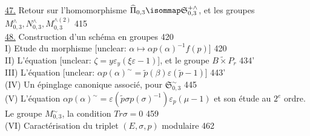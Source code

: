 \vspace{0.5em}
\noindent \underline{47.} Retour sur l'homomorphisme $\widehat{\Pi}_{0,3} \isommap \mathfrak{S}^{+\wedge}_{0,3}$, et les groupes $M_{0,3}^\wedge, N_{0,3}^\wedge, M_{0,3}^{\wedge(2)}$ \hfill 415\\
\underline{48.} Construction d'un schéma en groupes \hfill 420\\
\hspace*{1em} I) Etude du morphisme [unclear: $\alpha \mapsto \alpha p(\alpha)^{-1} f(p)$] \hfill 420\\
\hspace*{1em} II) L'équation [unclear: $\zeta = y \varepsilon_y (\xi \varepsilon - 1)$], et le groupe $B \tilde{\times} P_r$ \hfill 434'\\
\hspace*{1em} III) L'équation [unclear: $\alpha p(\alpha)^\sim = \tilde{p}(\beta)\varepsilon(\tilde{p}-1)$] \hfill 443'\\
\hspace*{1em} (IV) Un épinglage canonique associé, pour $\mathfrak{S}_{0,3}^\sim$ \hfill 445\\
\hspace*{1em} (V) L'équation $\alpha p(\alpha)^\sim = \varepsilon(\tilde{p} \sigma p(\sigma)^{-1}) \varepsilon_p(\mu - 1)$ et son étude au $2^e$ ordre. Le groupe $M_{0,3}^\sim$, la condition $Tr \sigma = 0$ \hfill 459\\
\hspace*{1em} (VI) Caractérisation du triplet $(E, \sigma, p)$ modulaire \hfill 462\\

